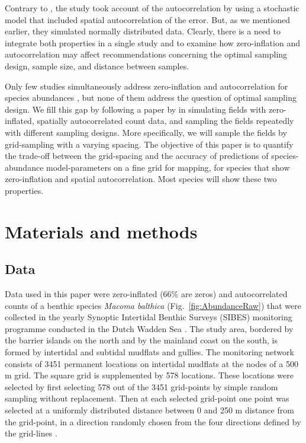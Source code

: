 \documentclass[review]{elsarticle}
\begin{document}
Contrary to \citet{tyre2003}, the \citeauthor{bijleveld2012} study took account of the autocorrelation by using a stochastic model that included spatial autocorrelation of the error. But, as we mentioned earlier, they simulated normally distributed data. Clearly, there is a need to integrate both properties in a single study and to examine how zero-inflation and autocorrelation may affect recommendations concerning the optimal sampling design, sample size, and distance between samples.

Only few studies simultaneously address zero-inflation and autocorrelation for species abundances \citep[see e.g.][]{recta2012, boyd2015}, but none of them address the question of optimal sampling design.  We fill this gap by following a paper by \citet{lyashevska2015a} in simulating fields with zero-inflated, spatially autocorrelated count data, and sampling the fields repeatedly with different sampling designs. More specifically, we will sample the fields by grid-sampling with a varying spacing. The objective of this paper is to quantify the trade-off between the grid-spacing and the accuracy of predictions of species-abundance model-parameters on a fine grid for mapping, for species that show zero-inflation and spatial autocorrelation. Most species will show these two properties.

\section{Materials and methods} \label{sec:methods}


\subsection{Data}

Data used in this paper were zero-inflated (66\% are zeros) and autocorrelated counts of a benthic species \textit{Macoma balthica} (Fig.~\ref{fig:AbundanceRaw}) that were collected in the yearly Synoptic Intertidal Benthic Surveys (SIBES) monitoring programme conducted in the Dutch Wadden Sea \citep{bijleveld2012, compton2013}. The study area, bordered by the barrier islands on the north and by the mainland coast on the south, is formed by intertidal and subtidal mudflats and gullies. The monitoring network consists of 3451 permanent locations on intertidal mudflats at the nodes of a 500 m grid. The square grid is supplemented by 578 locations. These locations were selected by first selecting 578 out of the 3451 grid-points by simple random sampling without replacement. Then at each selected grid-point one point was selected at a uniformly distributed distance between 0 and 250 m distance from the grid-point, in a direction randomly chosen from the four directions defined by the grid-lines \citep{bijleveld2012}.
\end{document}

